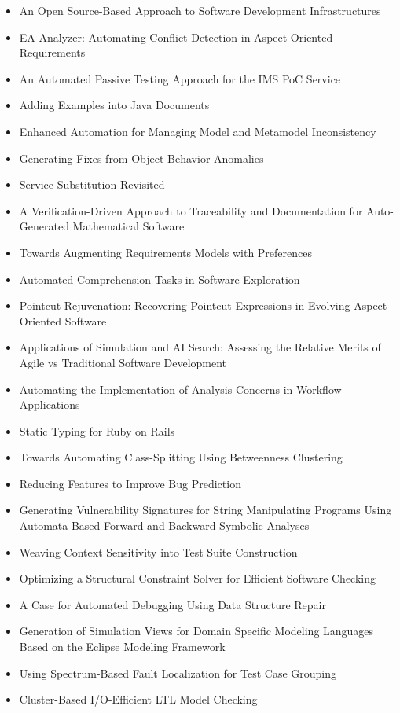 {\begin{itemize}[itemsep=-1ex]
  \item An Open Source-Based Approach to Software Development Infrastructures
  \item EA-Analyzer: Automating Conflict Detection in Aspect-Oriented Requirements
  \item An Automated Passive Testing Approach for the IMS PoC Service
  \item Adding Examples into Java Documents
  \item Enhanced Automation for Managing Model and Metamodel Inconsistency
  \item Generating Fixes from Object Behavior Anomalies
  \item Service Substitution Revisited
  \item A Verification-Driven Approach to Traceability and Documentation for Auto-Generated Mathematical Software
  \item Towards Augmenting Requirements Models with Preferences
  \item Automated Comprehension Tasks in Software Exploration
  \item Pointcut Rejuvenation: Recovering Pointcut Expressions in Evolving Aspect-Oriented Software
  \item Applications of Simulation and AI Search: Assessing the Relative Merits of Agile vs Traditional Software Development
  \item Automating the Implementation of Analysis Concerns in Workflow Applications
  \item Static Typing for Ruby on Rails
  \item Towards Automating Class-Splitting Using Betweenness Clustering
  \item Reducing Features to Improve Bug Prediction
  \item Generating Vulnerability Signatures for String Manipulating Programs Using Automata-Based Forward and Backward Symbolic Analyses
  \item Weaving Context Sensitivity into Test Suite Construction
  \item Optimizing a Structural Constraint Solver for Efficient Software Checking
  \item A Case for Automated Debugging Using Data Structure Repair
  \item Generation of Simulation Views for Domain Specific Modeling Languages Based on the Eclipse Modeling Framework
  \item Using Spectrum-Based Fault Localization for Test Case Grouping
  \item Cluster-Based I/O-Efficient LTL Model Checking

\end{itemize}}
